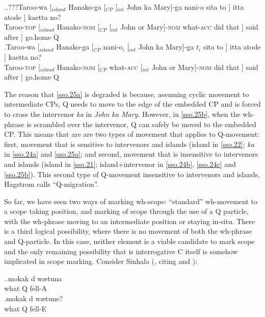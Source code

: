 \documentclass{glossa}
\begin{document}
\ex.\ag.???\label{sso.25a}Taroo-wa [$_{island}$ Hanako-ga [$_{CP}$ [$_{int}$ John ka Mary]-ga nani-o sita to ] itta atode ] kaetta no?\\
   Taroo-\textsc{top} [$_{island}$ Hanako-\textsc{nom} [$_{CP}$ [$_{int}$ John or Mary]-\textsc{nom} what-\textsc{acc} did that ] said after ] go.home Q\\
   \bg.\label{sso.25b}Taroo-wa [$_{island}$ Hanako-ga [$_{CP}$ nani-o$_i$ [$_{int}$ John ka Mary]-ga $t_i$ sita to ] itta atode ] kaetta no?\\
   Taroo-\textsc{top} [$_{island}$ Hanako-\textsc{nom} [$_{CP}$ what-\textsc{acc} [$_{int}$ John or Mary]-\textsc{nom} {} did that ] said after ] go.home Q\\

The reason that \ref{sso.25a} is degraded is because, assuming cyclic movement to intermediate CPs, Q needs to move to the edge of the embedded CP and is forced to cross the intervenor \textit{ka} in \textit{John ka Mary}. However, in \ref{sso.25b}, when the wh-phrase is scrambled over the intervenor, Q can safely be moved to the embedded CP. This means that are are two types of movement that applies to Q-movement: first, movement that is sensitive to intervenors and islands (island in \ref{sso.22}; \textit{ka} in \ref{sso.24a} and \ref{sso.25a}; and second, movement that is insensitive to intervenors and islands (island in \ref{sso.21}; island+intervenor in \ref{sso.24b}, \ref{sso.24c} and \ref{sso.25b}). This second type of Q-movement insensitive to intervenors and islands, Hagstrom calls ``Q-migration''.


So far, we have seen two ways of marking wh-scope: ``standard'' wh-movement to a scope taking position, and marking of scope through the use of a Q particle, with the wh-phrase moving to an intermediate position or staying in-situ. There is a third logical possibility, where there is no movement of both the wh-phrase and Q-particle. In this case, neither element is a viable candidate to mark scope and the only remaining possibility that is interrogative C itself is somehow implicated in scope marking. Consider Sinhala (\cite{slade:2011}, citing \cite{gair-sumangala:1991} and \cite{hagstrom:1998}):

\ex.\ag.\label{sso.30a}mokak d{\textschwa} w{\ae}tuna\\
   what Q fell-A\\
   \bg.\label{sso.30b}mokak d{\textschwa} w{\ae}tune?\\
   what Q fell-E\\
\end{document}
